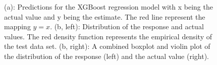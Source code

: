 \documentclass[
]{article}
\begin{document}
\begin{figure}[h]
    \centering
    \qquad
    \caption{(a): Predictions for the XGBoost regression model with x being the actual value and y being the estimate. The red line represent the mapping $y=x$. (b, left): Distribution of the response and actual values. The red density function represents the empirical density of the test data set. (b, right): A combined boxplot and violin plot of the distribution of the response (left) and the actual value (right).}
\end{figure}
\end{document}
